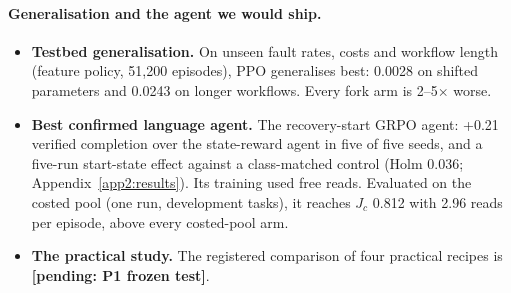 \documentclass[11pt]{article}
\newcommand{\pend}[1]{\textbf{[pending: #1]}}
\begin{document}
\begin{table}[t]
\centering\small
{}
\caption{LAB1, exact regret $J^*-J$ (5 seeds $\times$ 12 settings) at matched episodes. A scripted
verify-every-risky-write policy has regret 0.0064.}
\label{tab:l1}
\end{table}

\paragraph{Generalisation and the agent we would ship.}
\begin{itemize}
\item \textbf{Testbed generalisation.} On unseen fault rates, costs and workflow length (feature policy, 51{,}200
episodes), PPO generalises best: 0.0028 on shifted parameters and 0.0243 on longer workflows. Every fork arm is
2--5$\times$ worse.
\item \textbf{Best confirmed language agent.} The recovery-start GRPO agent: +0.21 verified completion over the
state-reward agent in five of five seeds, and a five-run start-state effect against a class-matched control (Holm
0.036; Appendix~\ref{app2:results}). Its training used free reads. Evaluated on the costed pool (one run,
development tasks), it reaches $J_c$ 0.812 with 2.96 reads per episode, above every costed-pool arm.
\item \textbf{The practical study.} The registered comparison of four practical recipes is \pend{P1 frozen test}.
\end{itemize}
\end{document}
